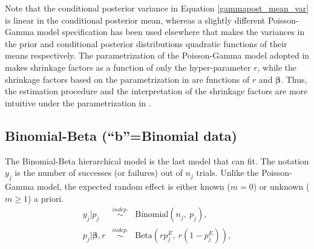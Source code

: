 \documentclass[article]{jss}
\begin{document}
Note that the conditional posterior variance in Equation \ref{gammapost_mean_var} is linear in the conditional posterior mean, whereas a slightly different Poisson-Gamma model specification has been used elsewhere \citep{morris1997} that makes the variances in the prior and conditional posterior distributions  quadratic functions of their means respectively. The parametrization of the Poisson-Gamma model adopted in  makes shrinkage factors as a function of only the hyper-parameter $r$, while the shrinkage factors based on the parametrization in \cite{morris1997} are functions of $r$ and $\boldsymbol{\beta}$. Thus, the estimation procedure and the interpretation of the shrinkage factors are more intuitive under the parametrization in .

\subsection[Binomial-Beta]{Binomial-Beta (``b''=Binomial data)}
The Binomial-Beta hierarchical model is the last model that  can fit. The notation $y_{j}$ is the number of successes (or failures) out of $n_{j}$ trials. Unlike the Poisson-Gamma model, the expected random effect is either known ($m=0$) or unknown ($m\ge1$) a priori.
\begin{eqnarray}
y_{j} \vert p_{j} &\stackrel{indep.}{\sim}& \textrm{Binomial}(n_{j}, ~p_{j}),\\
p_{j} \vert \boldsymbol{\beta}, r &\stackrel{indep.}{\sim}&\textrm{Beta}(rp^E_j,~ r(1-p^E_j)),
\end{eqnarray}
\end{document}

